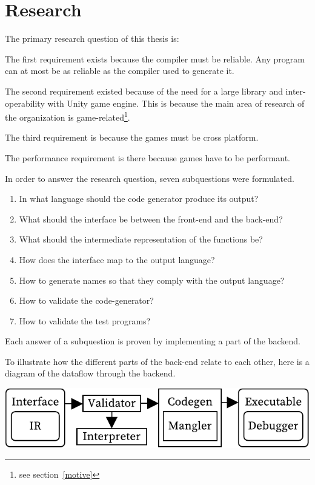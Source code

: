 \section{Research}\label{research}

The primary research question of this thesis is:



The first requirement exists because the compiler must be reliable.
Any program can at most be as reliable as the compiler used to generate it.

\label{whydotnet}
The second requirement existed because of the need for a large library and inter-operability with Unity game engine.
This is because the main area of research of the organization is game-related\footnote{see section~\ref{motive}}.

The third requirement is because the games must be cross platform.

The performance requirement is there because games have to be performant.

In order to answer the research question, seven subquestions were formulated.

\begin{enumerate}
    \item In what language should the code generator produce its output?
    \item What should the interface be between the front-end and the back-end?
    \item What should the intermediate representation of the functions be?
    \item How does the interface map to the output language?
    \item How to generate names so that they comply with the output language?
    \item How to validate the code-generator?
    \item How to validate the test programs?
\end{enumerate}

Each answer of a subquestion is proven by implementing a part of the backend. 

To illustrate how the different parts of the back-end relate to each other, here is a diagram of the dataflow through the backend.

\includegraphics[width=\columnwidth]{overview}

